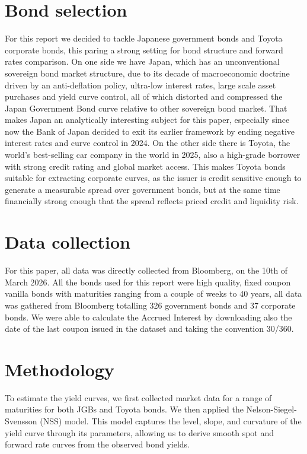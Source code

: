 \documentclass[11pt,oneside]{scrartcl}
\begin{document}
\section{Bond selection}
For this report we decided to tackle Japanese government bonds and Toyota corporate bonds, this paring a strong setting for bond structure and forward rates comparison. On one side we have Japan, which has an unconventional sovereign bond market structure, due to its decade of macroeconomic doctrine driven by an anti-deflation policy, ultra-low interest rates, large scale asset purchases and yield curve control, all of which distorted and compressed the Japan Government Bond curve relative to other sovereign bond market. That makes Japan an analytically interesting subject for this paper, especially since now the Bank of Japan decided to exit its earlier framework by ending negative interest rates and curve control in 2024. On the other side there is Toyota, the world’s best-selling car company in the world in 2025, also a high-grade borrower with strong credit rating and global market access. This makes Toyota bonds suitable for extracting corporate curves, as the issuer is credit sensitive enough to generate a measurable spread over government bonds, but at the same time financially strong enough that the spread reflects priced credit and liquidity risk. 

\section{Data collection}
For this paper, all data was directly collected from Bloomberg, on the 10th of March 2026. All the bonds used for this report were high quality, fixed coupon vanilla bonds with maturities ranging from a couple of weeks to 40 years, all data was gathered from Bloomberg totalling 326 government bonds and 37 corporate bonds. 
We were able to calculate the Accrued Interest by downloading also the date of the last coupon issued in the dataset and taking the convention 30/360. 


\section{Methodology}
To estimate the yield curves, we first collected market data for a range of maturities for both JGBs and Toyota bonds. We then applied the Nelson-Siegel-Svensson (NSS) model. This model captures the level, slope, and curvature of the yield curve through its parameters, allowing us to derive smooth spot and forward rate curves from the observed bond yields.
\end{document}
